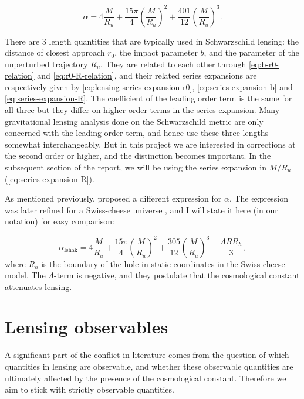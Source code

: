 \begin{equation}
  \alpha = 4 \frac{M}{R_u} + \frac{15\pi}{4} \left ( \frac{M}{R_u} \right )^2 + \frac{401}{12} \left ( \frac{M}{R_u} \right )^3.
  \label{eq:series-expansion-R}
\end{equation}

There are 3 length quantities that are typically used in Schwarzschild lensing: the distance of closest approach $r_0$, the impact parameter $b$, and the parameter of the unperturbed trajectory $R_u$. They are related to each other through \autoref{eq:b-r0-relation} and \autoref{eq:r0-R-relation}, and their related series expansions are respectively given by \autoref{eq:lensing-series-expansion-r0}, \autoref{eq:series-expansion-b} and \autoref{eq:series-expansion-R}. The coefficient of the leading order term is the same for all three but they differ on higher order terms in the series expansion. Many gravitational lensing analysis done on the Schwarzschild metric are only concerned with the leading order term, and hence use these three lengths somewhat interchangeably. But in this project we are interested in corrections at the second order or higher, and the distinction becomes important. In the subsequent section of the report, we will be using the series expansion in $M/R_u$ (\autoref{eq:series-expansion-R}). 

As mentioned previously, \citet{rindler2007contribution} proposed a different expression for $\alpha$. The expression was later refined for a Swiss-cheese universe \citep{ishak2008new}, and I will state it here (in our notation) for easy comparison:

\begin{equation}
  \alpha_{\text{Ishak}} = 4 \frac{M}{R_u} + \frac{15\pi}{4} \left ( \frac{M}{R_u} \right )^2 + \frac{305}{12} \left ( \frac{M}{R_u} \right )^3 - \frac{\Lambda R R_h}{3},
  \label{eq:rindler-ishak-alpha}
\end{equation}
where $R_h$ is the boundary of the hole in static coordinates in the Swiss-cheese model. The $\Lambda$-term is negative, and they postulate that the cosmological constant attenuates lensing. 

\section{Lensing observables}

A significant part of the conflict in literature comes from the question of which quantities in lensing are observable, and whether these observable quantities are ultimately affected by the presence of the cosmological constant. Therefore we aim to stick with strictly observable quantities. 

